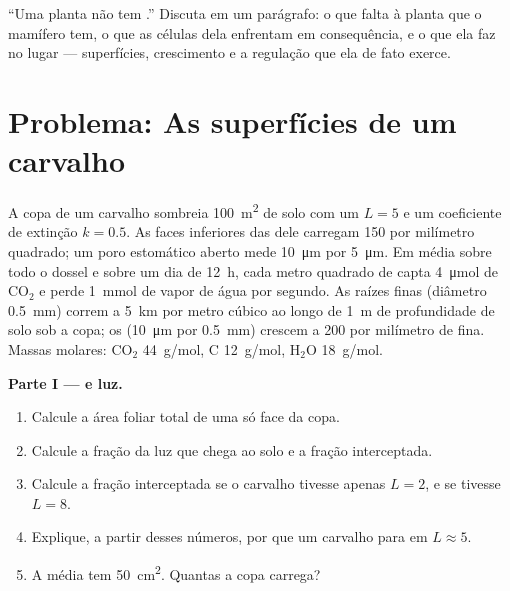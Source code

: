 \begin{exercise}[$\star\star\star$]\label{exo:b1:flowering-plant-organization:12}
``Uma planta não tem .'' Discuta em um parágrafo: o que
falta à planta que o mamífero tem, o que as células dela enfrentam em
consequência, e o que ela faz no lugar --- superfícies, crescimento e a
regulação que ela de fato exerce.
\end{exercise}

\section{Problema: As superfícies de um carvalho}

\begin{problem}
\label{pb:b1:flowering-plant-organization:1}
A copa de um carvalho sombreia \qty{100}{m^2} de solo com um  $L = 5$ e um coeficiente de extinção $k = 0.5$. As faces
inferiores das  dele carregam \qty{150}{}  por milímetro
quadrado; um poro estomático aberto mede \qty{10}{\micro m} por
\qty{5}{\micro m}. Em média sobre todo o dossel e sobre um dia de
\qty{12}{h}, cada metro quadrado de  capta \qty{4}{\micro mol} de
$\mathrm{CO_2}$ e perde \qty{1}{mmol} de vapor de água por segundo. As
raízes finas (diâmetro \qty{0.5}{mm}) correm a \qty{5}{km} por metro
cúbico ao longo de \qty{1}{m} de profundidade de solo sob a copa; os
 (\qty{10}{\micro m} por \qty{0.5}{mm}) crescem a
\qty{200}{} por milímetro de  fina. Massas molares:
$\mathrm{CO_2}$ \qty{44}{g/mol}, C \qty{12}{g/mol},
$\mathrm{H_2O}$ \qty{18}{g/mol}.

\medskip
\noindent\textbf{Parte I ---  e luz.}
\begin{enumerate}
  \item Calcule a área foliar total de uma só face da copa.
  \item Calcule a fração da luz que chega ao solo e a fração
        interceptada.
  \item Calcule a fração interceptada se o carvalho tivesse apenas
        $L = 2$, e se tivesse $L = 8$.
  \item Explique, a partir desses números, por que um carvalho para em
        $L \approx 5$.
  \item A  média tem \qty{50}{cm^2}. Quantas  a copa carrega?
\end{enumerate}


\end{problem}
